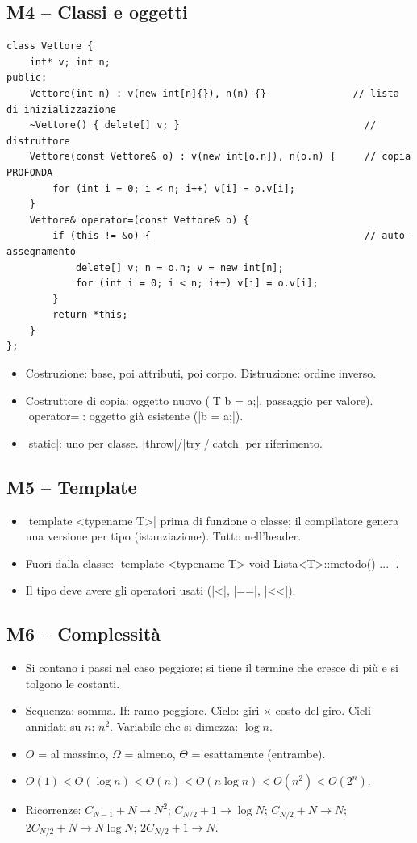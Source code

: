 \subsection*{M4 -- Classi e oggetti}
\begin{lstlisting}
class Vettore {
    int* v; int n;
public:
    Vettore(int n) : v(new int[n]{}), n(n) {}               // lista di inizializzazione
    ~Vettore() { delete[] v; }                                // distruttore
    Vettore(const Vettore& o) : v(new int[o.n]), n(o.n) {     // copia PROFONDA
        for (int i = 0; i < n; i++) v[i] = o.v[i];
    }
    Vettore& operator=(const Vettore& o) {
        if (this != &o) {                                     // auto-assegnamento
            delete[] v; n = o.n; v = new int[n];
            for (int i = 0; i < n; i++) v[i] = o.v[i];
        }
        return *this;
    }
};
\end{lstlisting}
\begin{itemize}
  \item Costruzione: base, poi attributi, poi corpo. Distruzione: ordine inverso.
  \item Costruttore di copia: oggetto nuovo (\cc|T b = a;|, passaggio per valore).
        \cc|operator=|: oggetto già esistente (\cc|b = a;|).
  \item \cc|static|: uno per classe. \cc|throw|/\cc|try|/\cc|catch| per riferimento.
\end{itemize}

\subsection*{M5 -- Template}
\begin{itemize}
  \item \cc|template <typename T>| prima di funzione o classe; il compilatore genera una
        versione per tipo (istanziazione). Tutto nell'header.
  \item Fuori dalla classe: \cc|template <typename T> void Lista<T>::metodo() { ... }|.
  \item Il tipo deve avere gli operatori usati (\cc|<|, \cc|==|, \cc|<<|).
\end{itemize}

\subsection*{M6 -- Complessità}
\begin{itemize}
  \item Si contano i passi nel caso peggiore; si tiene il termine che cresce di più e si
        tolgono le costanti.
  \item Sequenza: somma. If: ramo peggiore. Ciclo: giri $\times$ costo del giro. Cicli
        annidati su $n$: $n^2$. Variabile che si dimezza: $\log n$.
  \item $O$ = al massimo, $\Omega$ = almeno, $\Theta$ = esattamente (entrambe).
  \item $O(1) < O(\log n) < O(n) < O(n \log n) < O(n^2) < O(2^n)$.
  \item Ricorrenze: $C_{N-1}+N \to N^2$; $C_{N/2}+1 \to \log N$; $C_{N/2}+N \to N$;
        $2C_{N/2}+N \to N\log N$; $2C_{N/2}+1 \to N$.
\end{itemize}

